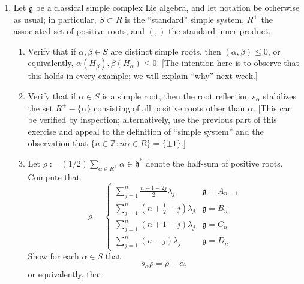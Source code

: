 \documentclass[reqno]{amsart} 
\begin{document}
\begin{homework}
\begin{enumerate}
  \item
    Let $\mathfrak{g}$ be a classical simple complex Lie
    algebra, and let notation be otherwise as usual; in particular, $S \subset R$ is the ``standard'' simple system,
    $R^+$ the associated set of positive roots, and $(,)$ the standard inner product.
    \begin{enumerate}
    \item Verify that if $\alpha,\beta \in S$ are distinct
      simple roots,
      then $(\alpha,\beta) \leq 0$, or equivalently,
      $\alpha(H_\beta), \beta(H_\alpha) \leq 0$. [The intention here is to observe that this holds 
      in every example; we will explain ``why'' next week.]
    \item Verify that if $\alpha \in S$ is a simple root,
      then the root reflection
      $s_\alpha$ stabilizes the set $R^+ - \{\alpha \}$
      consisting of all positive roots other than $\alpha$.
      [This can be verified by inspection; alternatively, use the previous part of this exercise
      and appeal to the definition of ``simple system'' and the observation that $\{n \in \mathbb{Z} : n \alpha \in R\} = \{\pm 1\}$.]
    \item Let $\rho := (1/2) \sum_{\alpha \in R^+} \alpha \in
      \mathfrak{h}^*$ denote the half-sum of positive roots.
      Compute that
      \begin{equation}\label{eqn:explicit-rho-half-sum-computation-classical-families}
        \rho
        = 
\begin{cases}
          \sum_{j=1}^n
          \frac{n + 1 - 2 j}{2} \lambda_j
           & \mathfrak{g} = A_{n-1} \\
           \sum_{j=1}^n
           (n + \frac{1}{2} - j) \lambda_j
           & \mathfrak{g} = B_n \\
           \sum_{j=1}^n
           (n + 1 - j) \lambda_j
           & \mathfrak{g} = C_n \\
           \sum_{j=1}^n
           (n-j) \lambda_j
           & \mathfrak{g} = D_n.
        \end{cases}
      \end{equation}
      Show for each $\alpha \in S$
      that      
      \begin{equation}\label{eqn:explicit-rho-half-sum-computation-classical-families-consequence-1}
        s_\alpha \rho = \rho - \alpha,
      \end{equation}
      or equivalently,
      that
      \begin{equation}\label{eqn:explicit-rho-half-sum-computation-classical-families-consequence-2}

\end{equation}
\end{enumerate}
\end{enumerate}
\end{homework}
\end{document}
